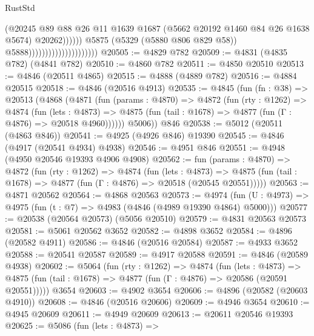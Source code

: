 \begin{lexlean}{RustStd}
\begin{coremodule}
                                                        (@20245
                                                          @89
                                                          @88
                                                          @26
                                                          @11
                                                          @1639
                                                          @1687
                                                          (@5662 @20192 @1460 @84 @26 @1638 @5674)
                                                          @20262))))))
                                              @5875
                                              (@5329 (@5880 @806 @829 @58))
                                              @5888)))))))))))))))))))))
@20505 := @4829 @782
@20509 := @4831 (@4835 @782) (@4841 @782)
@20510 := @4860 @782
@20511 := @4850 @20510
@20513 := @4846 (@20511 @4865)
@20515 := @4888 (@4889 @782)
@20516 := @4884 @20515
@20518 := @4846 (@20516 @4913)
@20535 := @4845
    (fun (fn : @38) =>
    @20513
      (@4868
        (@4871
          (fun (params : @4870) =>
          @4872
            (fun (rty : @1262) =>
            @4874
              (fun (lets : @4873) =>
              @4875 (fun (tail : @1678) => @4877 (fun (Γ : @4876) => @20518 @4960))))))
        @5006))
    @846
@20538 := @5012 (@20511 (@4863 @846))
@20541 := @4925 (@4926 @846) @19390
@20545 := @4846 (@4917 (@20541 @4934) @4938)
@20546 := @4951 @846
@20551 := @4948 (@4950 @20546 @19393 @4906 @4908)
@20562 := fun (params : @4870) =>
  @4872
    (fun (rty : @1262) =>
    @4874
      (fun (lets : @4873) =>
      @4875 (fun (tail : @1678) => @4877 (fun (Γ : @4876) => @20518 (@20545 @20551)))))
@20563 := @4871 @20562
@20564 := @4868 @20563
@20573 := @4974
    (fun (U : @4973) => @4975 (fun (t : @7) => @4983 (@4846 (@4989 @19390 @4864) @5000)))
@20577 := @20538 (@20564 @20573) (@5056 @20510)
@20579 := @4831 @20563 @20573
@20581 := @5061 @20562 @3652
@20582 := @4898 @3652
@20584 := @4896 (@20582 @4911)
@20586 := @4846 (@20516 @20584)
@20587 := @4933 @3652
@20588 := @20541 @20587
@20589 := @4917 @20588
@20591 := @4846 (@20589 @4938)
@20602 := @5064
    (fun (rty : @1262) =>
    @4874
      (fun (lets : @4873) =>
      @4875 (fun (tail : @1678) => @4877 (fun (Γ : @4876) => @20586 (@20591 @20551)))))
    @3654
@20603 := @4902 @3654
@20606 := @4896 (@20582 (@20603 @4910))
@20608 := @4846 (@20516 @20606)
@20609 := @4946 @3654
@20610 := @4945 @20609
@20611 := @4949 @20609
@20613 := @20611 @20546 @19393
@20625 := @5086
    (fun (lets : @4873) =>

\end{coremodule}
\end{lexlean}
